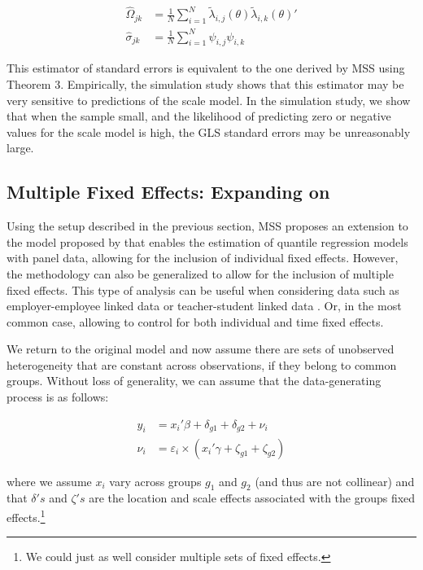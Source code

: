 \documentclass[
  authoryear,
  review,
  1p]{elsarticle}
\begin{document}
\[\begin{aligned}
\hat\Omega_{jk} &= \frac{1}{N} \sum_{i=1}^N \tilde \lambda_{i,j}(\theta) \tilde \lambda_{i,k}(\theta)' \\
\hat\sigma_{jk} &= \frac{1}{N} \sum_{i=1}^N \psi_{i,j} \psi_{i,k}
\end{aligned}
\]

This estimator of standard errors is equivalent to the one derived by
MSS using Theorem 3. Empirically, the simulation study shows that this
estimator may be very sensitive to predictions of the scale model. In
the simulation study, we show that when the sample small, and the
likelihood of predicting zero or negative values for the scale model is
high, the GLS standard errors may be unreasonably large.

\subsection{\texorpdfstring{Multiple Fixed Effects: Expanding on
\citet{mss2019}}{Multiple Fixed Effects: Expanding on @mss2019}}\label{multiple-fixed-effects-expanding-on-mss2019}

Using the setup described in the previous section, MSS proposes an
extension to the model proposed by \citet{he1997} that enables the
estimation of quantile regression models with panel data, allowing for
the inclusion of individual fixed effects. However, the methodology can
also be generalized to allow for the inclusion of multiple fixed
effects. This type of analysis can be useful when considering data such
as employer-employee linked data \citep{abowed2006} or teacher-student
linked data \citep{harrissass2011}. Or, in the most common case,
allowing to control for both individual and time fixed effects.

We return to the original model and now assume there are sets of
unobserved heterogeneity that are constant across observations, if they
belong to common groups. Without loss of generality, we can assume that
the data-generating process is as follows:

\[\begin{aligned}
  y_{i} &= x_{i}' \beta + \delta_{g1} + \delta_{g2} + \nu_i \\
  \nu_i &= \varepsilon_i \times (x_{i}' \gamma + \zeta_{g1} + \zeta_{g2})   
  \end{aligned}
\]

where we assume \(x_{i}\) vary across groups \(g_1\) and \(g_2\) (and
thus are not collinear) and that \(\delta's\) and \(\zeta's\) are the
location and scale effects associated with the groups fixed
effects.\footnote{We could just as well consider multiple sets of fixed
  effects.}
\end{document}
